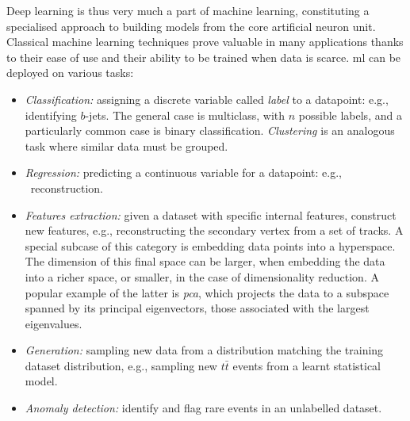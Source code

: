 Deep learning is thus very much a part of machine learning, constituting a specialised approach to building models from the core artificial neuron unit. Classical machine learning techniques prove valuable in many applications thanks to their ease of use and their ability to be trained when data is scarce. \gls{ml} can be deployed on various tasks: 
\begin{itemize}
    \item \textit{Classification:} assigning a discrete variable called \textit{label} to a datapoint: e.g., identifying $b$-jets. The general case is multiclass, with $n$ possible labels, and a particularly common case is binary classification. \textit{Clustering} is an analogous task where similar data must be grouped.
    \item \textit{Regression:} predicting a continuous variable for a datapoint: e.g., \pt\ reconstruction. 
    \item \textit{Features extraction:} given a dataset with specific internal features, construct new features, e.g., reconstructing the secondary vertex from a set of tracks. A special subcase of this category is embedding data points into a hyperspace. The dimension of this final space can be larger, when embedding the data into a richer space, or smaller, in the case of dimensionality reduction. A popular example of the latter is \textit{\gls{pca}}, which projects the data to a subspace spanned by its principal eigenvectors, those associated with the largest eigenvalues.
    \item \textit{Generation:} sampling new data from a distribution matching the training dataset distribution, e.g., sampling new $t\bar{t}$ events from a learnt statistical model. 
    \item \textit{Anomaly detection:} identify and flag rare events in an unlabelled dataset.
\end{itemize}

